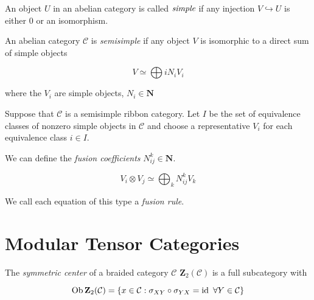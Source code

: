 \begin{defn}
    An object $U$ in an abelian category is called $\emph{simple}$ if any
    injection $V \hookrightarrow U$ is either $0$ or an isomorphism.
\end{defn}

\begin{defn}
    An abelian category $\mathcal{C}$ is \emph{semisimple} if any object $V$ is isomorphic to a direct sum of simple objects

    \begin{equation}
        V \simeq \bigoplus{i} N_i V_i
    \end{equation}

    where the $V_i$ are simple objects, $N_i \in \mathbf{N}$

\end{defn}

    Suppose that $\mathcal{C}$ is a semisimple ribbon category. Let $I$ be the
    set of equivalence classes of nonzero simple objects in $\mathcal{C}$ and
    choose a representative $V_i$ for each equivalence class  $i \in I$.
    
    We can define the \emph{fusion coefficients} $N_{ij}^k \in \mathbf{N}$.

    \begin{equation}
        V_i \otimes V_j \simeq \bigoplus_k N_{ij}^k V_k
    \end{equation}

    We call each equation of this type a \emph{fusion rule}. 

\section{Modular Tensor Categories}




\begin{defn}
    The \emph{symmetric center} of a braided category $\mathcal{C}$
    $\mathbf{Z}_2(\mathcal{C})$ is a full subcategory with 

    \begin{equation}
        \operatorname{Ob} \mathbf{Z}_2(\mathcal{C}) = \left\{ x \in \mathcal{C} : \sigma_{XY} \circ \sigma_{YX} = \operatorname{id}\ \forall Y \in \mathcal{C} \right\}
    \end{equation}


\end{defn}


